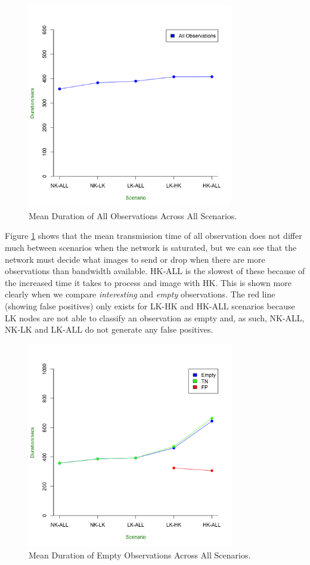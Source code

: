 	\begin{figure}[h]
	\centering
	\includegraphics[width=0.8\textwidth]{Chap7/figures/saturated/total_dur}
	\caption{Mean Duration of All Observations Across All Scenarios.}
	\label{fig:sat:total:dur}
	\end{figure}

Figure \ref{fig:sat:total:dur} shows that the mean transmission time of all observation does not differ much between scenarios when the network is saturated, but we can see that the network must decide what images to send or drop when there are more observations than bandwidth available. HK-ALL is the slowest of these because of the increased time it takes to process and image with HK. This is shown more clearly when we compare \textit{interesting} and \textit{empty} observations. The red line (showing false positives) only exists for LK-HK and HK-ALL scenarios because LK nodes are not able to classify an observation as empty and, as such, NK-ALL, NK-LK and LK-ALL do not generate any false positives.

	\begin{figure}[h]
	\centering
	\includegraphics[width=0.8\textwidth]{Chap7/figures/saturated/empty_dur}
	\caption{Mean Duration of Empty Observations Across All Scenarios.}
	\label{fig:sat:empty:dur}
	\end{figure}

